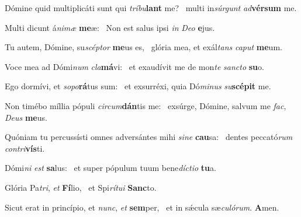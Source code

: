 \item Dómine quid multiplicáti sunt qui \textit{tríbu}\textbf{lant} me?~\psstar{} multi in\textit{súrgunt} \textit{ad}\textbf{vér}\textbf{sum} me.
\item Multi dicunt á\textit{nimæ} \textbf{me}æ:~\psstar{} Non est salus ipsi \textit{in} \textit{Deo} \textbf{e}jus.
\item Tu autem, Dómine, su\textit{scéptor} \textbf{me}us es,~\psstar{} glória mea, et exál\textit{tans} \textit{caput} \textbf{me}um.
\item Voce mea ad Dómi\textit{num} \textit{cla}\textbf{má}vi:~\psstar{} et exaudívit me de mon\textit{te} \textit{sancto} \textbf{su}o.
\item Ego dormívi, et \textit{sopo}\textbf{rá}tus sum:~\psstar{} et exsurréxi, quia Dó\textit{minus} \textit{su}\textbf{scé}\textbf{pit} me.
\item Non timébo míllia pópuli \textit{circum}\textbf{dán}tis me:~\psstar{} exsúrge, Dómine, salvum me \textit{fac}, \textit{Deus} \textbf{me}us.
\item Quóniam tu percussísti omnes adversántes mihi \textit{sine} \textbf{cau}sa:~\psstar{} dentes peccató\textit{rum} \textit{contri}\textbf{vís}ti.
\item Dómi\textit{ni} \textit{est} \textbf{sa}lus:~\psstar{} et super pópulum tuum bene\textit{díctio} \textbf{tu}a.
\item Glória Pa\textit{tri}, \textit{et} \textbf{Fí}lio,~\psstar{} et Spi\textit{rítui} \textbf{Sanc}to.
\item Sicut erat in princípio, et \textit{nunc}, \textit{et} \textbf{sem}per,~\psstar{} et in sǽcula sæ\textit{culórum}. \textbf{A}men.